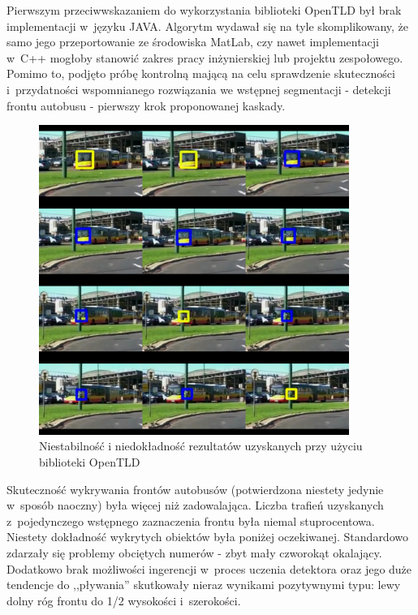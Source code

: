Pierwszym przeciwwskazaniem do wykorzystania biblioteki OpenTLD 
był brak implementacji w~języku JAVA. Algorytm wydawał się na tyle
skomplikowany, że samo jego przeportowanie ze środowiska MatLab,
czy nawet implementacji w~C++ mogłoby stanowić zakres pracy 
inżynierskiej lub projektu zespołowego.
Pomimo to, podjęto próbę kontrolną mającą na celu sprawdzenie
skuteczności i~przydatności wspomnianego rozwiązania we wstępnej 
segmentacji - detekcji frontu autobusu - 
pierwszy krok proponowanej kaskady.

\begin{figure}[h!]
    \centering
    \includegraphics[width=0.9\textwidth]{img/exp_open_tld_fail}
    \caption{Niestabilność i niedokładność rezultatów uzyskanych przy
    użyciu biblioteki OpenTLD}
    \label{fig:opentld_bus_front_fail}
\end{figure}

Skuteczność wykrywania frontów autobusów (potwierdzona 
niestety jedynie w~sposób naoczny) była więcej niż zadowalająca.
Liczba trafień uzyskanych z~pojedynczego wstępnego zaznaczenia frontu
była niemal stuprocentowa. Niestety dokładność wykrytych obiektów
była poniżej oczekiwanej. Standardowo zdarzały się problemy
obciętych numerów - zbyt mały czworokąt okalający. Dodatkowo
brak możliwości ingerencji w~proces uczenia detektora oraz jego
duże tendencje do ,,pływania'' skutkowały nieraz wynikami pozytywnymi
typu: lewy dolny róg frontu do 1/2 wysokości i~szerokości. 

